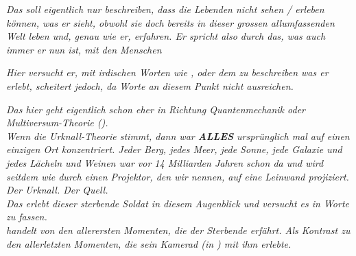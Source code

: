 \documentclass[twocolumn,10pt]{article}
\begin{document}
			\begin{center}
			\end{center}
			\textit{Das soll eigentlich nur beschreiben, dass die Lebenden nicht sehen / erleben können, was er sieht, obwohl sie doch bereits in dieser grossen allumfassenden Welt leben und, genau wie er, erfahren. Er spricht also durch das, was auch immer er nun ist, mit den Menschen}
			\begin{center}
			\end{center}
			\textit{Hier versucht er, mit irdischen Worten wie ,  oder dem  zu beschreiben was er erlebt, scheitert jedoch, da Worte an diesem Punkt nicht ausreichen.}
			\begin{center}
			\end{center}
			\textit{Das hier geht eigentlich schon eher in Richtung Quantenmechanik oder Multiversum-Theorie ().}\\
			\textit{Wenn die Urknall-Theorie stimmt, dann war \textbf{ALLES} ursprünglich mal auf einen einzigen Ort konzentriert. Jeder Berg, jedes Meer, jede Sonne, jede Galaxie und jedes Lächeln und Weinen war vor 14 Milliarden Jahren schon da und wird seitdem wie durch einen Projektor, den wir  nennen, auf eine Leinwand projiziert. Der Urknall. Der Quell.}\\
			\textit{Das erlebt dieser sterbende Soldat in diesem Augenblick und versucht es in Worte zu fassen.}\\
			\textit{ handelt von den allerersten Momenten, die der Sterbende erfährt. Als Kontrast zu den allerletzten Momenten, die sein Kamerad (in ) mit ihm erlebte.}
		\clearpage
\end{document}
